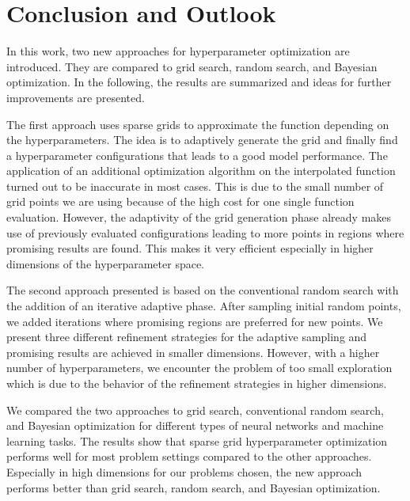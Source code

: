 
\chapter{Conclusion and Outlook}\label{chapter:conclusion_and_outlook}

In this work, two new approaches for hyperparameter optimization are introduced. They are compared to grid search, random search, and Bayesian optimization. In the following, the results are summarized and ideas for further improvements are presented. \newline

The first approach uses sparse grids to approximate the function depending on the hyperparameters. The idea is to adaptively generate the grid and finally find a hyperparameter configurations that leads to a good model performance. The application of an additional optimization algorithm on the interpolated function turned out to be inaccurate in most cases. This is due to the small number of grid points we are using because of the high cost for one single function evaluation. However, the adaptivity of the grid generation phase already makes use of previously evaluated configurations leading to more points in regions where promising results are found. This makes it very efficient especially in higher dimensions of the hyperparameter space. \newline 

The second approach presented is based on the conventional random search with the addition of an iterative adaptive phase. After sampling initial random points, we added iterations where promising regions are preferred for new points. We present three different refinement strategies for the adaptive sampling and promising results are achieved in smaller dimensions. However, with a higher number of hyperparameters, we encounter the problem of too small exploration which is due to the behavior of the refinement strategies in higher dimensions. \newline 

We compared the two approaches to grid search, conventional random search, and Bayesian optimization for different types of neural networks and machine learning tasks. The results show that sparse grid hyperparameter optimization performs well for most problem settings compared to the other approaches. Especially in high dimensions for our problems chosen, the new approach performs better than grid search, random search, and Bayesian optimization. 

